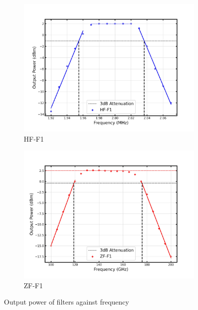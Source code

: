\documentclass[12pt]{article}
\begin{document}
\begin{figure}[H]
     \centering
     \begin{subfigure}{.45\textwidth}
         \caption{HF-F1}
        \label{fig1.21}
         \centering
         \includegraphics[width=\textwidth]{fig/Exercise 1.21.jpg}
     \end{subfigure}
     \hfill
     \begin{subfigure}{.45\textwidth}
         \centering
         \caption{ZF-F1}
         \label{fig1.22}
         \includegraphics[width=\textwidth]{fig/Exercise 1.22.jpg}
     \end{subfigure}
     \caption{Output power of filters against frequency}
     \label{figure2}
 \end{figure}
 
\end{document}
